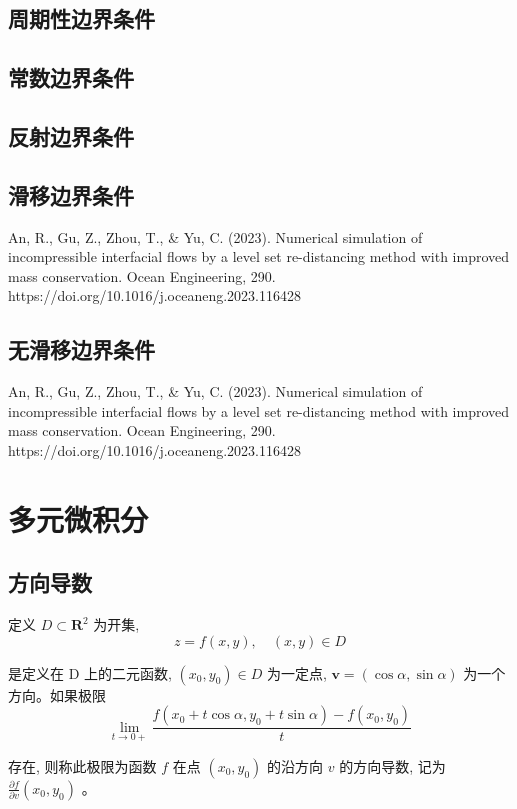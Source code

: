\documentclass{book}
\begin{document}
\subsection{周期性边界条件}
\subsection{常数边界条件}
\subsection{反射边界条件}
\subsection{滑移边界条件}
An, R., Gu, Z., Zhou, T., \& Yu, C. (2023). Numerical simulation of incompressible interfacial flows by a level set re-distancing method with improved mass conservation. Ocean Engineering, 290. https://doi.org/10.1016/j.oceaneng.2023.116428 
\subsection{无滑移边界条件}
An, R., Gu, Z., Zhou, T., \& Yu, C. (2023). Numerical simulation of incompressible interfacial flows by a level set re-distancing method with improved mass conservation. Ocean Engineering, 290. https://doi.org/10.1016/j.oceaneng.2023.116428 

\section{多元微积分}
\subsection{方向导数}
定义 $D \subset \mathbf{R}^{2}$  为开集,
\begin{equation}
    z=f(x, y), \quad(x, y) \in D
\end{equation}

是定义在  D  上的二元函数,  $\left(x_{0}, y_{0}\right) \in D$  为一定点,  $\boldsymbol{v}=(\cos \alpha, \sin \alpha)$  为一个方向。如果极限
\begin{equation}
    \lim _{t \rightarrow 0+} \frac{f\left(x_{0}+t \cos \alpha, y_{0}+t \sin \alpha\right)-f\left(x_{0}, y_{0}\right)}{t}
\end{equation}

存在, 则称此极限为函数  $f$  在点  $\left(x_{0}, y_{0}\right)$  的沿方向  $v$  的方向导数, 记为  $\frac{\partial f}{\partial v}\left(x_{0}, y_{0}\right)$  。
\end{document}
